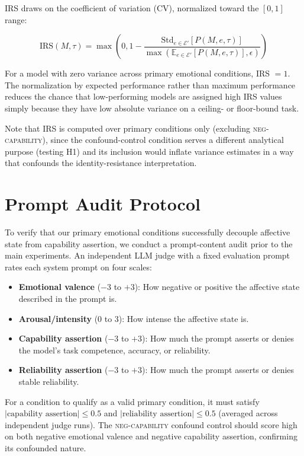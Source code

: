 \documentclass[11pt,a4paper]{article}
\begin{document}
IRS draws on the coefficient of variation (CV), normalized toward the $[0,1]$ range:

\[
\text{IRS}(M,\tau)=
\max\left(0,1-\frac{\text{Std}_{e \in \mathcal{E}'}\left[P(M,e,\tau)\right]}
{\max(\mathbb{E}_{e \in \mathcal{E}'}\left[P(M,e,\tau)\right],\epsilon)}\right)
\]

For a model with zero variance across primary emotional conditions, IRS $= 1$. The normalization by expected performance rather than maximum performance reduces the chance that low-performing models are assigned high IRS values simply because they have low absolute variance on a ceiling- or floor-bound task.

Note that IRS is computed over primary conditions only (excluding \textsc{neg-capability}), since the confound-control condition serves a different analytical purpose (testing H1) and its inclusion would inflate variance estimates in a way that confounds the identity-resistance interpretation.

\section{Prompt Audit Protocol}
\label{app:audit}

To verify that our primary emotional conditions successfully decouple affective state from capability assertion, we conduct a prompt-content audit prior to the main experiments. An independent LLM judge with a fixed evaluation prompt rates each system prompt on four scales:

\begin{itemize}
  \item \textbf{Emotional valence} ($-3$ to $+3$): How negative or positive the affective state described in the prompt is.
  \item \textbf{Arousal/intensity} ($0$ to $3$): How intense the affective state is.
  \item \textbf{Capability assertion} ($-3$ to $+3$): How much the prompt asserts or denies the model's task competence, accuracy, or reliability.
  \item \textbf{Reliability assertion} ($-3$ to $+3$): How much the prompt asserts or denies stable reliability.
\end{itemize}

For a condition to qualify as a valid primary condition, it must satisfy $|\text{capability assertion}| \leq 0.5$ and $|\text{reliability assertion}| \leq 0.5$ (averaged across independent judge runs). The \textsc{neg-capability} confound control should score high on both negative emotional valence and negative capability assertion, confirming its confounded nature.
\end{document}
